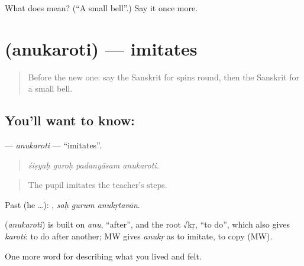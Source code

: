 \begin{tcolorbox}[breakable,colback=teal!4,colframe=teal!35!black,title={Before you move on}]
What does  mean? (\textquotedblleft{}A small bell\textquotedblright{}.) Say it once more.
\end{tcolorbox}
\section[\texorpdfstring{\sk{अनुकरोति} (anukaroti)}{अनुकरोति (anukaroti)}]{ (anukaroti) — imitates}

\label{lesson:SA-C522-anukaroti}



\begin{quote}
Before the new one: say the Sanskrit for spins round, then the Sanskrit for a small bell.
\end{quote}

\subsection*{You'll want to know: }
\textbf{} — \emph{anukaroti} — \textquotedblleft{}imitates\textquotedblright{}.

\begin{quote}
   
\end{quote}

\begin{quote}
\emph{śiṣyaḥ guroḥ padanyāsam anukaroti.}
\end{quote}

\begin{quote}
The pupil imitates the teacher's steps.
\end{quote}

Past (he …):   , \emph{saḥ gurum anukṛtavān}.

\begin{cousinweb}
\textbf{} (\emph{anukaroti}) is built on \emph{anu}, \textquotedblleft{}after\textquotedblright{}, and the root √kṛ, \textquotedblleft{}to do\textquotedblright{}, which also gives \emph{karoti}: to do after another; MW gives \emph{anukṛ} as to imitate, to copy (MW).
\end{cousinweb}

\begin{grammarlens}[title={What you've built}]
One more word for describing what you lived and felt.
\end{grammarlens}

